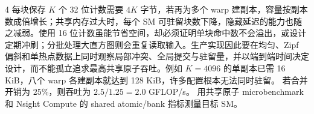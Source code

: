 \begin{solutionexercise}{4}
每块保存 $K$ 个 32 位计数需要 $4K$ 字节，若再为多个 warp 建副本，容量按副本数成倍增长；共享内存过大时，每个 SM 可驻留块数下降，隐藏延迟的能力也随之减弱。使用 16 位计数虽能节省空间，却必须证明单块命中数不会溢出，或设计定期冲刷；分批处理大直方图则会重复读取输入。生产实现因此要在均匀、Zipf 偏斜和单热点数据上同时观察局部冲突、全局提交与驻留量，并以端到端时间决定设计，而不能孤立追求最高共享原子吞吐。例如 $K=4096$ 的单副本已需 16 KiB，八个 warp 各建副本就达到 128 KiB，许多配置根本无法同时驻留。
\variantheading 若合并开销为 $25\%$，则吞吐为 $2.5/1.25=2.0$ GFLOP/s。
\practiceheading 用共享原子 microbenchmark 和 Nsight Compute 的 shared atomic/bank 指标测量目标 SM。
\end{solutionexercise}

